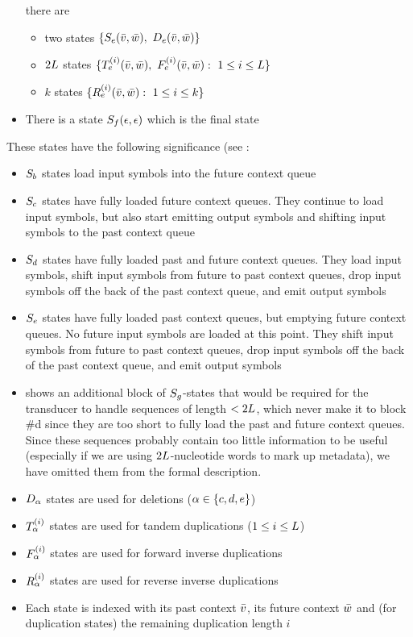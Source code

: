 \documentclass[english]{article}
\begin{document}
\begin{itemize}
  there are
  \begin{itemize}
  \item two states $\{ {S}_{e}(\bar{v},\bar{w}),\ {D}_{e}(\bar{v},\bar{w}) \}$
  \item $2L$ states $\{ \tanstate{e}{i}(\seqpast,\seqnext),\ \fwdstate{e}{i}(\seqpast,\seqnext):\ 1 \leq i \leq \contextlen \}$
  \item $k$ states $\{ {R}_{e}^{(i)}(\bar{v},\bar{w}):\ 1 \leq i \leq k \}$
  \end{itemize}
\item There is a state ${S}_{f}(\epsilon,\epsilon)$ which is the final state
\end{itemize}
These states have the following significance (see :
\begin{itemize}
  \item ${S}_{b}$ states load input symbols into the future context queue
  \item ${S}_{c}$ states have fully loaded future context queues. They continue to load input symbols, but also start emitting output symbols and shifting input symbols to the past context queue
  \item ${S}_{d}$ states have fully loaded past and future context queues. They load input symbols, shift input symbols from future to past context queues, drop input symbols off the back of the past context queue, and emit output symbols
  \item ${S}_{e}$ states have fully loaded past context queues, but emptying future context queues. No future input symbols are loaded at this point. They shift input symbols from future to past context queues, drop input symbols off the back of the past context queue, and emit output symbols
  \item {} shows an additional block of ${S}_{g}$-states that would be required for the transducer to handle sequences of length $<2L$, which never make it to block \#d since they are too short to fully load the past and future context queues. Since these sequences probably contain too little information to be useful (especially if we are using $2L$-nucleotide words to mark up metadata), we have omitted them from the formal description.
  \item ${D}_{\alpha}$ states are used for deletions ($\alpha \in \{ c, d, e \}$)
  \item ${T}_{\alpha}^{(i)}$ states are used for tandem duplications ($1 \leq i \leq L$)
  \item ${F}_{\alpha}^{(i)}$ states are used for forward inverse duplications
  \item ${R}_{\alpha}^{(i)}$ states are used for reverse inverse duplications
  \item Each state is indexed with its past context $\bar{v}$, its future context $\bar{w}$ and (for duplication states) the remaining duplication length $i$
\end{itemize}
\end{document}
